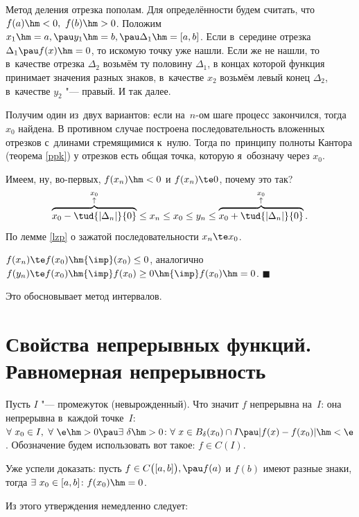 \documentclass[a4paper,10pt,twoside]{article}
\newenvironment{Proof}
       {\par\noindent{\textbf{Доказательство.}}}
       {\hfill$\scriptstyle\blacksquare$}
\let\AVsection\section{}
\renewcommand\section{\newpage\scol\AVsection}
\newcommand{\scol}{  \renewcommand{\headrulewidth}{0.5pt}\fancyhead[RE,LO]{\thesection{} \leftmark} \fancyhead[LE,RO]{\thepage}}
\begin{document}
\begin{Proof}
Метод деления отрезка пополам. Для определённости будем считать, что $f(a)\hm<0,\ f(b)\hm>0$. Положим $x_1\hm=a,\pau y_1\hm=b,\pau \Delta_1\hm=[a,b]$. Если в~середине отрезка $\Delta_1\pau f(x)\hm=0$, то искомую точку уже нашли. Если же не нашли, то в~качестве отрезка $\Delta_2$ возьмём ту половину $\Delta_1$, в
концах которой функция принимает значения разных знаков, в~качестве $x_2$ возьмём левый конец $\Delta_2$, в~качестве $y_2$ "--- правый.
И так далее.

Получим один из~двух вариантов: если на~$n$-ом шаге процесс закончился, тогда $x_0$ найдена.
В противном случае построена последовательность вложенных отрезков с~длинами стремящимися к~нулю. Тогда по~принципу полноты Кантора (теорема \ref{ppk}) у отрезков есть общая точка, которую я~обозначу через $x_0$.

Имеем, ну, во-первых, $f(x_n)\hm<0$ и $f(x_n)\te0$, почему это так?
    $$
    \overbrace{x_0-\tud{|\Delta_n|}{0}}^{\begin{smallmatrix}x_0\\ \uparrow\end{smallmatrix}}\leq x_n\leq x_0\leq y_n\leq
    \overbrace{x_0+\tud{|\Delta_n|}{0}}^{\begin{smallmatrix}x_0\\ \uparrow \end{smallmatrix}}.
$$
По лемме \ref{lzp} о зажатой последовательности $x_n\te x_0$.

$f(x_n)\te f(x_0)\hm{\imp}(x_0)\leq0$, аналогично $f(y_n)\te f(x_0)\hm{\imp} f(x_0)\geq0\hm{\imp} f(x_0)\hm=0$.
\end{Proof}

Это обосновывает метод интервалов.

\section{Свойства непрерывных функций. Равномерная непрерывность}
Пусть $I$ "--- промежуток (невырожденный). Что значит $f$ непрерывна на~$I$: она непрерывна в~каждой точке~$I$:
$\forall\  x_0\in I,\ \forall\ \e\hm>0\pau \exists\  \delta\hm>0\colon
\forall\  x\in B_\delta(x_0)\cap I\pau |f(x)-f(x_0)|\hm<\e$.
 Обозначение будем использовать вот такое: $f\in C(I)$.

Уже успели доказать: пусть $f\in C\big([a,b]\big),\pau f(a)$ и $f(b)$ имеют разные знаки,
тогда $\exists\  x_0\in [a,b]\colon f(x_0)\hm=0$.

Из этого утверждения немедленно следует:
\end{document}
